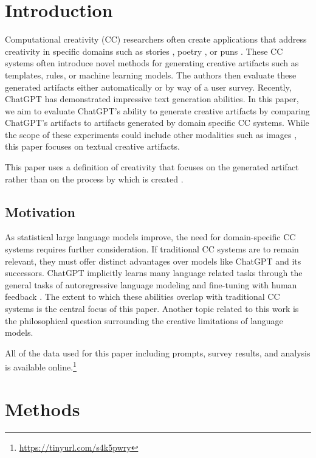 \documentclass[phd,electronic,oneside,twosidetoc,letterpaper,chaptercenter,parttop,lof]{byumsphd}
\begin{document}
\section{Introduction}

Computational creativity (CC) researchers often create applications that address creativity in specific domains such as stories \cite{perez2001mexica}, poetry \cite{boggia2022poetry}, or puns \cite{ritchie2003jape}.
These CC systems often introduce novel methods for generating creative artifacts such as templates, rules, or machine learning models.
The authors then evaluate these generated artifacts either automatically or by way of a user survey. 
Recently, ChatGPT \cite{chatGPT} has demonstrated impressive text generation abilities. 
In this paper, we aim to evaluate ChatGPT's ability to generate creative artifacts by comparing ChatGPT's artifacts to artifacts generated by domain specific CC systems.
While the scope of these experiments could include other modalities such as images \cite{ramesh2021dalle}, this paper focuses on textual creative artifacts.

This paper uses a definition of creativity that focuses on the generated artifact rather than on the process by which is created \cite{wiggins2006creativity}.

\subsection{Motivation}

As statistical large language models improve, the need for domain-specific CC systems requires further consideration.
If traditional CC systems are to remain relevant, they must offer distinct advantages over models like ChatGPT and its successors.
ChatGPT implicitly learns many language related tasks through the general tasks of autoregressive language modeling \cite{radford2018gpt2} and fine-tuning with human feedback \cite{ouyang2022instructgpt}.
The extent to which these abilities overlap with traditional CC systems is the central focus of this paper.
Another topic related to this work is the philosophical question surrounding the creative limitations of language models.



All of the data used for this paper including prompts, survey results, and analysis is available online.\footnote{\url{https://tinyurl.com/s4k5pwry}}



\section{Methods}
\end{document}

